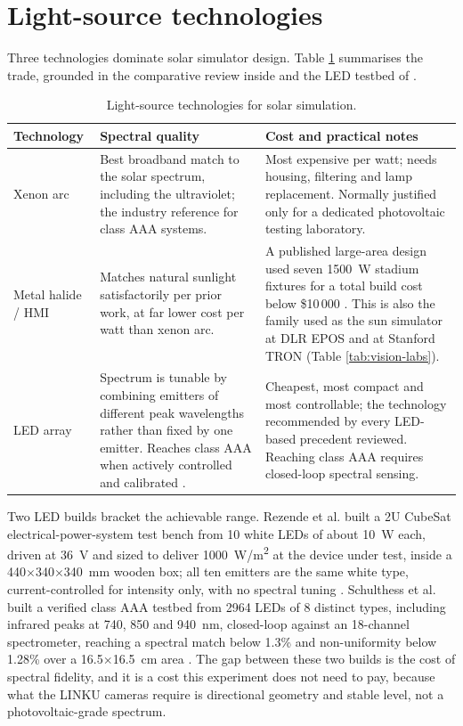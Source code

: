 \section{Light-source technologies}

Three technologies dominate solar simulator design. Table \ref{tab:tech} summarises the trade, grounded in the comparative review inside \cite{rezende2024lowcost} and the LED testbed of \cite{schulthess2026classaaa}.

\begin{table}[!ht]
\centering
\small
\caption[Solar simulator light-source technologies]{Light-source technologies for solar simulation.}
\label{tab:tech}
\begin{tabularx}{\textwidth}{p{} X X}
\toprule
\textbf{Technology} & \textbf{Spectral quality} & \textbf{Cost and practical notes} \\
\midrule
Xenon arc & Best broadband match to the solar spectrum, including the ultraviolet; the industry reference for class AAA systems. & Most expensive per watt; needs housing, filtering and lamp replacement. Normally justified only for a dedicated photovoltaic testing laboratory. \\
Metal halide / HMI & Matches natural sunlight satisfactorily per prior work, at far lower cost per watt than xenon arc. & A published large-area design used seven 1500~W stadium fixtures for a total build cost below \$10\,000 \cite{rezende2024lowcost}. This is also the family used as the sun simulator at DLR EPOS and at Stanford TRON (Table \ref{tab:vision-labs}). \\
LED array & Spectrum is tunable by combining emitters of different peak wavelengths rather than fixed by one emitter. Reaches class AAA when actively controlled and calibrated \cite{schulthess2026classaaa}. & Cheapest, most compact and most controllable; the technology recommended by every LED-based precedent reviewed. Reaching class AAA requires closed-loop spectral sensing. \\
\bottomrule
\end{tabularx}
\end{table}

Two LED builds bracket the achievable range. Rezende et al. built a 2U CubeSat electrical-power-system test bench from 10 white LEDs of about 10~W each, driven at 36~V and sized to deliver 1000~W/m\textsuperscript{2} at the device under test, inside a 440$\times$340$\times$340~mm wooden box; all ten emitters are the same white type, current-controlled for intensity only, with no spectral tuning \cite{rezende2024lowcost}. Schulthess et al. built a verified class AAA testbed from 2964 LEDs of 8 distinct types, including infrared peaks at 740, 850 and 940~nm, closed-loop against an 18-channel spectrometer, reaching a spectral match below 1.3\% and non-uniformity below 1.28\% over a 16.5$\times$16.5~cm area \cite{schulthess2026classaaa}. The gap between these two builds is the cost of spectral fidelity, and it is a cost this experiment does not need to pay, because what the LINKU cameras require is directional geometry and stable level, not a photovoltaic-grade spectrum.

